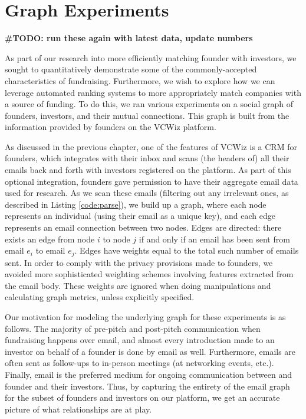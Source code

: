 \chapter{Graph Experiments}

\textbf{\#TODO: run these again with latest data, update numbers}

As part of our research into more efficiently matching founder with investors, we sought to quantitatively demonstrate some of the commonly-accepted characteristics of fundraising. Furthermore, we wish to explore how we can leverage automated ranking systems to more appropriately match companies with a source of funding. To do this, we ran various experiments on a social graph of founders, investors, and their mutual connections. This graph is built from the information provided by founders on the VCWiz platform.

As discussed in the previous chapter, one of the features of VCWiz is a CRM for founders, which integrates with their inbox and scans (the headers of) all their emails back and forth with investors registered on the platform. As part of this optional integration, founders gave permission to have their aggregate email data used for research. As we scan these emails (filtering out any irrelevant ones, as described in Listing \ref{code:parse}), we build up a graph, where each node represents an individual (using their email as a unique key), and each edge represents an email connection between two nodes. Edges are directed: there exists an edge from node $i$ to node $j$ if and only if an email has been sent from email $e_i$ to email $e_j$. Edges have weights equal to the total such number of emails sent. In order to comply with the privacy provisions made to founders, we avoided more sophisticated weighting schemes involving features extracted from the email body. These weights are ignored when doing manipulations and calculating graph metrics, unless explicitly specified.

Our motivation for modeling the underlying graph for these experiments is as follows. The majority of pre-pitch and post-pitch communication when fundraising happens over email, and almost every introduction made to an investor on behalf of a founder is done by email as well. Furthermore, emails are often sent as follow-ups to in-person meetings (at networking events, etc.). Finally, email is the preferred medium for ongoing communication between and founder and their investors. Thus, by capturing the entirety of the email graph for the subset of founders and investors on our platform, we get an accurate picture of what relationships are at play.

